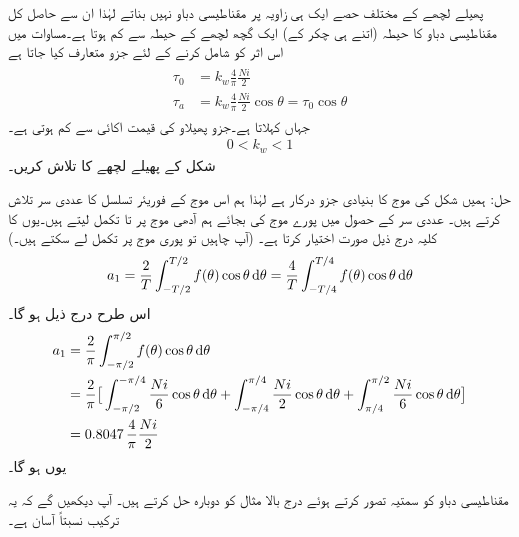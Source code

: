 پھیلے لچھے کے مختلف حصے ایک ہی زاویہ پر مقناطیسی دباو نہیں بناتے لہٰذا ان سے حاصل کل مقناطیسی دباو کا حیطہ  (اتنے ہی چکر کے) ایک گچھ لچھے   کے حیطہ سے  کم ہوتا ہے۔مساوات  میں اس اثر کو شامل کرنے کے لئے جزو   متعارف کیا جاتا ہے
\begin{gather}
\begin{aligned}
\tau_0&=k_w \frac{4}{\pi}\frac{N i}{2}\\
\tau_{a}&=k_w \frac{4}{\pi}\frac{N i}{2} \cos \theta=\tau_0 \cos \theta \label{مساوات_گھومتے_مشین_دباو_سائن_نما}
\end{aligned}
\end{gather}
جہاں     کہلاتا ہے۔جزو پھیلاو کی قیمت  اکائی سے کم ہوتی ہے۔
\begin{align}
0<k_w<1
\end{align}
%
شکل   کے  پھیلے لچھے کا   تلاش کریں۔

حل:\quad
ہمیں شکل  کی موج کا بنیادی جزو درکار ہے لہٰذا ہم اس موج کے فوریئر تسلسل کا عددی سر  تلاش کرتے ہیں۔ عددی سر کے حصول میں پورے موج کی بجائے ہم  آدھی موج پر  تا  تکمل لیتے ہیں۔یوں  کا کلیہ درج ذیل صورت اختیار کرتا ہے۔ (آپ چاہیں تو پوری موج پر تکمل لے سکتے ہیں۔)
\begin{align*}
a_1=\frac{2}{T}\int_{-T/2}^{T/2}f(\theta)\cos\theta\dif \theta=\frac{4}{T}\int_{-T/4}^{T/4}f(\theta)\cos\theta\dif\theta
\end{align*}
اس طرح درج ذیل ہو گا۔
\begin{align*}
a_1&=\frac{2}{\pi}\int_{-\pi/2}^{\pi/2}f(\theta)\cos \theta\dif \theta\\
&=\frac{2}{\pi}\big[\int_{-\pi/2}^{-\pi/4} \frac{Ni}{6}\cos\theta\dif \theta+\int_{-\pi/4}^{\pi/4}\frac{Ni}{2}\cos\theta\dif\theta+\int_{\pi/4}^{\pi/2}\frac{Ni}{6}\cos\theta\dif\theta\big]\\
&=0.8047 \, \frac{4}{\pi}\frac{Ni}{2}
\end{align*}
یوں  ہو گا۔

مقناطیسی دباو کو سمتیہ تصور کرتے ہوئے درج بالا مثال کو دوبارہ حل کرتے ہیں۔ آپ دیکھیں گے کہ یہ ترکیب نسبتاً آسان ہے۔ 

